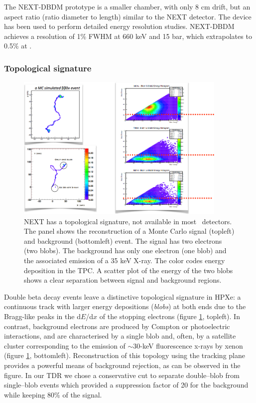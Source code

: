 \documentclass[a4paper,11pt,oneside]{article}
\begin{document}
The NEXT-DBDM prototype is a smaller chamber, with only 8 cm drift, but an aspect ratio (ratio diameter to length) similar to the NEXT detector. The device has been used to perform detailed energy resolution studies. NEXT-DBDM achieves a resolution of 1\% FWHM at 660 keV and 15 bar, which extrapolates to 0.5\% at \Qbb.

\subsubsection*{Topological signature}

\begin{figure}
\centering
\includegraphics[width=0.9\textwidth]{img/Topology.png}
\caption{\small NEXT has a topological signature, not available in most \bbonu\ detectors. The panel shows the reconstruction of a Monte Carlo signal (topleft) and background (bottomleft) event. The signal has two electrons (two blobs). The background has only one electron (one blob) and the associated emission of a 35 keV X-ray. The color codes energy deposition in the TPC. A scatter plot of the energy of the two blobs shows a clear separation between signal and background regions.}\label{fig.ETRK2}
\end{figure}
	
Double beta decay events leave a distinctive topological signature in HPXe: a continuous track with larger energy depositions (\emph{blobs}) at both ends due to the Bragg-like peaks in the d$E$/d$x$ of the stopping electrons (figure \ref{fig.ETRK2}, topleft). In contrast, background electrons are produced by Compton or photoelectric interactions, and are characterised by a single blob and, often, by a satellite cluster corresponding to the emission of $\sim30$-keV fluorescence x-rays by xenon (figure \ref{fig.ETRK2}, bottomleft).
Reconstruction of this topology using the tracking plane provides a powerful means of background rejection, as can be observed in the figure. In our TDR we chose a conservative cut to separate double--blob from single--blob events which provided a suppression factor of 20 for the background while keeping 80\% of the signal.  
\end{document}
